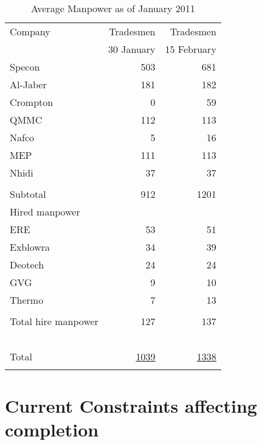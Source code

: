 \def\Z{\phantom{Z}}
\begin{table}[htbp]
\begin{center}
\begin{tabular}{l r r}
\toprule
Company       &Tradesmen & Tradesmen\\
~                 & 30 January & 15 February\\
\midrule
Specon          &503           & 681\\
Al-Jaber         &181           &182\\
Crompton       &   0           &59\\
QMMC            &112          &113\\
Nafco             &5              &16\\
MEP               &111          &113\\
Nhidi              & 37           &37\\
 & \underline{\phantom{1075}}&\underline{\phantom{1075}}\\
Subtotal         &912           &1201\\

Hired manpower      &               &\\
\Z ERE                     &53           &51\\
\Z Exblowra             &34            &39\\
\Z Deotech               &24           &24\\
\Z GVG                    &9             &10\\
\Z Thermo               &7             &13\\
                          & \underline{\phantom{1075}}& \underline{\phantom{1075}}\\
\Z Total hire manpower &127     &137\\
~&&\\
Total                      & \underline{\underline{1039}}       &\underline{\underline{1338}}\\
                             & &\\
\bottomrule
\end{tabular}
\caption{Average Manpower as of January 2011}
\label{tbl:manpower}
\end{center}
\end{table}




\section*{Current Constraints affecting completion}

